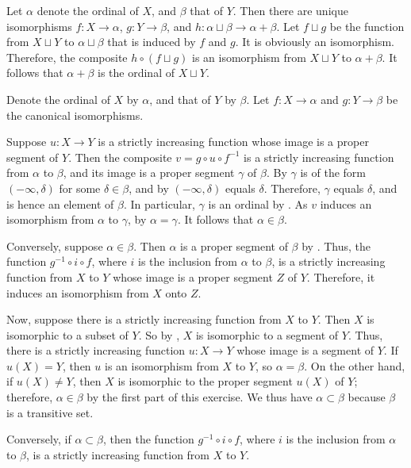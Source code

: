 \documentclass{article}
\begin{document}
\begin{solution}[\ref{exe:747n2vsf}]
  \label{sol:2jc3f0e5}
  Let \(\alpha\) denote the ordinal of \(X\), and \(\beta\) that of
  \(Y\).  Then there are unique isomorphisms \(f : X \to \alpha\),
  \(g : Y \to \beta\), and
  \(h : \alpha \sqcup \beta \to \alpha + \beta\).  Let \(f \sqcup g\)
  be the function from \(X \sqcup Y\) to \(\alpha \sqcup \beta\) that
  is induced by \(f\) and \(g\).  It is obviously an isomorphism.
  Therefore, the composite \(h \circ (f \sqcup g)\) is an isomorphism
  from \(X \sqcup Y\) to \(\alpha + \beta\).  It follows that
  \(\alpha + \beta\) is the ordinal of \(X \sqcup Y\).
\end{solution}

\begin{solution}
  \label{sol:87purs68}
  Denote the ordinal of \(X\) by \(\alpha\), and that of \(Y\) by
  \(\beta\).  Let \(f : X \to \alpha\) and \(g : Y \to \beta\) be the
  canonical isomorphisms.
  
  Suppose \(u : X \to Y\) is a strictly increasing function whose
  image is a proper segment of \(Y\).  Then the composite
  \(v = g \circ u \circ f^{-1}\) is a strictly increasing function
  from \(\alpha\) to \(\beta\), and its image is a proper segment
  \(\gamma\) of \(\beta\).  By  \(\gamma\) is of
  the form \((-\infty, \delta)\) for some \(\delta \in \beta\), and by
   \((-\infty, \delta)\) equals \(\delta\).
  Therefore, \(\gamma\) equals \(\delta\), and is hence an element of
  \(\beta\).  In particular, \(\gamma\) is an ordinal by
  .  As \(v\) induces an isomorphism from
  \(\alpha\) to \(\gamma\), by 
  \(\alpha = \gamma\).  It follows that \(\alpha \in \beta\).

  Conversely, suppose \(\alpha \in \beta\).  Then \(\alpha\) is a
  proper segment of \(\beta\) by .  Thus, the
  function \(g^{-1} \circ i \circ f\), where \(i\) is the inclusion
  from \(\alpha\) to \(\beta\), is a strictly increasing function from
  \(X\) to \(Y\) whose image is a proper segment \(Z\) of \(Y\).
  Therefore, it induces an isomorphism from \(X\) onto \(Z\).

  Now, suppose there is a strictly increasing function from \(X\) to
  \(Y\).  Then \(X\) is isomorphic to a subset of \(Y\).  So by
  , \(X\) is isomorphic to a segment of \(Y\).
  Thus, there is a strictly increasing function \(u : X \to Y\) whose
  image is a segment of \(Y\).  If \(u(X) = Y\), then \(u\) is an
  isomorphism from \(X\) to \(Y\), so \(\alpha = \beta\).  On the
  other hand, if \(u(X) \neq Y\), then \(X\) is isomorphic to the
  proper segment \(u(X)\) of \(Y\); therefore, \(\alpha \in \beta\) by
  the first part of this exercise.  We thus have
  \(\alpha \subset \beta\) because \(\beta\) is a transitive set.

  Conversely, if \(\alpha \subset \beta\), then the function
  \(g^{-1} \circ i \circ f\), where \(i\) is the inclusion from
  \(\alpha\) to \(\beta\), is a strictly increasing function from
  \(X\) to \(Y\).
\end{solution}
\end{document}
